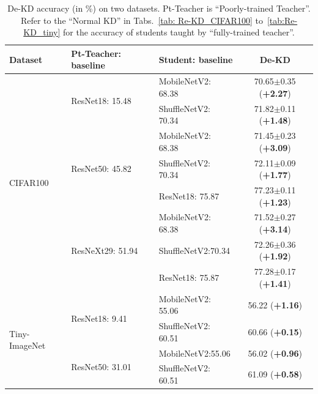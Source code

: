 \documentclass[10pt,twocolumn,letterpaper]{article}
\begin{document}
\begin{table}[!h]
\centering
\renewcommand\arraystretch{1.0}
\small
\caption{De-KD accuracy (in \%) on two datasets. Pt-Teacher is ``Poorly-trained Teacher''. Refer to the ``Normal KD'' in Tabs.~\ref{tab: Re-KD_CIFAR100} to~\ref{tab:Re-KD_tiny} for the accuracy of students taught by ``fully-trained teacher''.}
\label{tab: De-KD}
\begin{tabular}{l|l|l|c}
\toprule
Dataset & Pt-Teacher: baseline & Student: baseline &De-KD  \\ \midrule
\multirow{8}{*}{CIFAR100} & \multirow{2}{*}{ResNet18: 15.48} & MobileNetV2: 68.38  &70.65$\pm$0.35 (\textbf{+2.27}) \\ %
                           && ShuffleNetV2: 70.34 & 71.82$\pm$0.11 (\textbf{+1.48}) \\ \cmidrule{2-4}  
                           
            & \multirow{3}{*}{ResNet50: 45.82} & MobileNetV2: 68.38  &71.45$\pm$0.23 (\textbf{+3.09}) \\ %
                           & & ShuffleNetV2: 70.34 &72.11$\pm$0.09 (\textbf{+1.77}) \\ %
                           & & ResNet18: 75.87 &77.23$\pm$0.11 (\textbf{+1.23}) \\ \cmidrule{2-4}
            & \multirow{3}{*}{ResNeXt29: 51.94} & MobileNetV2: 68.38  &71.52$\pm$0.27 (\textbf{+3.14}) \\ %
                           && ShuffleNetV2:70.34 &72.26$\pm$0.36 (\textbf{+1.92}) \\ %
                           && ResNet18: 75.87 &77.28$\pm$0.17 (\textbf{+1.41}) \\ \midrule %
                           
                           
\multirow{4}{*}{Tiny-ImageNet} & \multirow{2}{*}{ResNet18: 9.41} & MobileNetV2: 55.06  &56.22 (\textbf{+1.16}) \\ %
        & & ShuffleNetV2: 60.51 & 60.66 (\textbf{+0.15})\\  \cmidrule{2-4}
        
        
        & \multirow{2}{*}{ResNet50: 31.01} & MobileNetV2:55.06  &56.02 (\textbf{+0.96}) \\ %
        & & ShuffleNetV2: 60.51 &61.09 (\textbf{+0.58})\\ \bottomrule
\end{tabular}
\vspace{-10pt}
\end{table}
\end{document}
